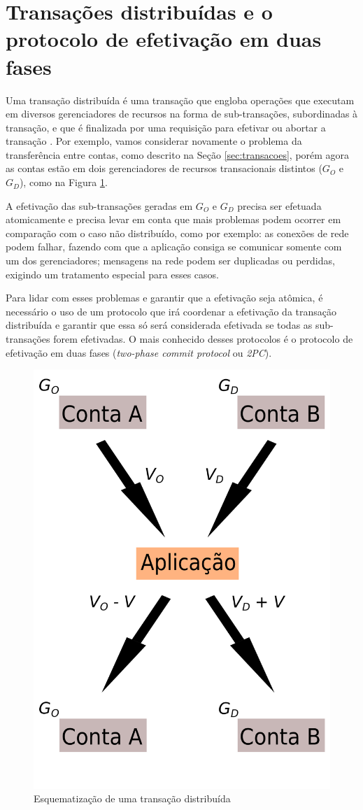 \documentclass[11pt,twoside,a4paper]{book}
\begin{document}
\section{Transações distribuídas e o protocolo de efetivação em duas fases}
\label{sec:transacoes_distribuidas}
\label{sec:2pc}

Uma transação distribuída é uma transação que engloba operações que executam em diversos gerenciadores de recursos na forma de sub-transações, subordinadas à transação, e que é finalizada por uma requisição para efetivar ou abortar a transação \cite{gray-lamport}. Por exemplo, vamos considerar novamente o problema da transferência entre contas, como descrito na Seção \ref{sec:transacoes}, porém agora as contas estão em dois gerenciadores de recursos transacionais distintos ($G_O$ e $G_D$), como na Figura \ref{fig:transacao_distribuida}.

A efetivação das sub-transações geradas em $G_O$ e $G_D$ precisa ser efetuada atomicamente e precisa levar em conta que mais problemas podem ocorrer em comparação com o caso não distribuído, como por exemplo: as conexões de rede podem falhar, fazendo com que a aplicação consiga se comunicar somente com um dos gerenciadores; mensagens na rede podem ser duplicadas ou perdidas, exigindo um tratamento especial para esses casos.

Para lidar com esses problemas e garantir que a efetivação seja atômica, é necessário o uso de um protocolo que irá coordenar a efetivação da transação distribuída e garantir que essa só será considerada efetivada se todas as sub-transações forem efetivadas. O mais conhecido desses protocolos é o protocolo de efetivação em duas fases (\emph{two-phase commit protocol} ou \emph{2PC}).

\begin{figure}
  \centering
  \includegraphics[width=.40\textwidth]{transacao_distribuida} 
  \caption{Esquematização de uma transação distribuída}
  \label{fig:transacao_distribuida} 
\end{figure}
\end{document}
